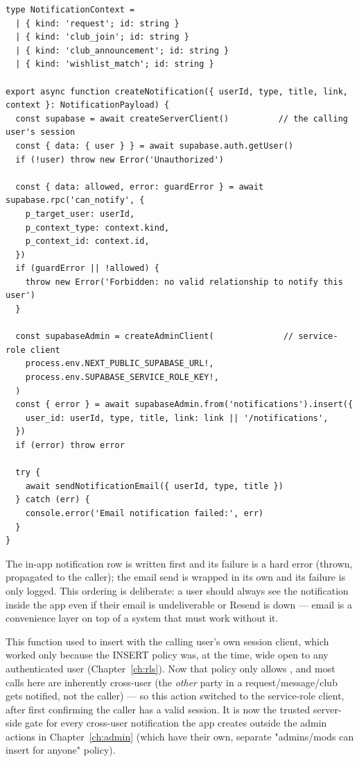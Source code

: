 \begin{lstlisting}[caption={src/lib/notifications.ts — in full}]
type NotificationContext =
  | { kind: 'request'; id: string }
  | { kind: 'club_join'; id: string }
  | { kind: 'club_announcement'; id: string }
  | { kind: 'wishlist_match'; id: string }

export async function createNotification({ userId, type, title, link, context }: NotificationPayload) {
  const supabase = await createServerClient()          // the calling user's session
  const { data: { user } } = await supabase.auth.getUser()
  if (!user) throw new Error('Unauthorized')

  const { data: allowed, error: guardError } = await supabase.rpc('can_notify', {
    p_target_user: userId,
    p_context_type: context.kind,
    p_context_id: context.id,
  })
  if (guardError || !allowed) {
    throw new Error('Forbidden: no valid relationship to notify this user')
  }

  const supabaseAdmin = createAdminClient(              // service-role client
    process.env.NEXT_PUBLIC_SUPABASE_URL!,
    process.env.SUPABASE_SERVICE_ROLE_KEY!,
  )
  const { error } = await supabaseAdmin.from('notifications').insert({
    user_id: userId, type, title, link: link || '/notifications',
  })
  if (error) throw error

  try {
    await sendNotificationEmail({ userId, type, title })
  } catch (err) {
    console.error('Email notification failed:', err)
  }
}
\end{lstlisting}

The in-app notification row is written first and its failure is a hard error (thrown, propagated to the caller); the email send is wrapped in its own  and its failure is only logged. This ordering is deliberate: a user should always see the notification inside the app even if their email is undeliverable or Resend is down — email is a convenience layer on top of a system that must work without it.

\begin{olknote}
This function used to insert with the calling user's own session client, which worked only because the  INSERT policy was, at the time, wide open to any authenticated user (Chapter~\ref{ch:rls}). Now that policy only allows , and most calls here are inherently cross-user (the \emph{other} party in a request/message/club gets notified, not the caller) — so this action switched to the service-role client, after first confirming the caller has a valid session. It is now the trusted server-side gate for every cross-user notification the app creates outside the admin actions in Chapter~\ref{ch:admin} (which have their own, separate "admins/mods can insert for anyone" policy).
\end{olknote}

